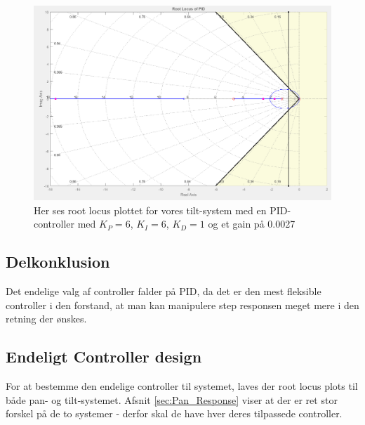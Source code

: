\begin{figure}[ht]
	\begin{center}
		\includegraphics[scale=0.45]{Billeder/PID_rlocus.PNG}
	\end{center}
\caption{Her ses root locus plottet for vores tilt-system med en PID-controller med $K_{P}=6$, $K_{I}=6$, $K_{D}=1$ og et gain på 0.0027}
\label{fig:PID_rlocus}
\end{figure}

\subsection{Delkonklusion}

Det endelige valg af controller falder på PID, da det er den mest fleksible controller i den forstand, at man kan manipulere step responsen meget mere i den retning der ønskes.


\subsection{Endeligt Controller design}

For at bestemme den endelige controller til systemet, laves der root locus plots til både pan- og tilt-systemet. Afsnit \ref{sec:Pan_Response} viser at der er ret stor forskel på de to systemer - derfor skal de have hver deres tilpassede controller.


